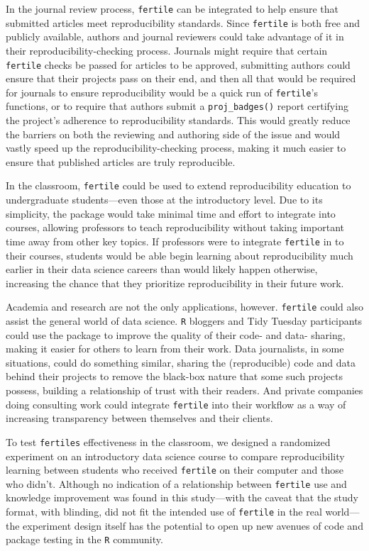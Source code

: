 \documentclass[12pt,twoside]{reedthesis}
\begin{document}
In the journal review process, \texttt{fertile} can be integrated to help ensure that submitted articles meet reproducibility standards. Since \texttt{fertile} is both free and publicly available, authors and journal reviewers could take advantage of it in their reproducibility-checking process. Journals might require that certain \texttt{fertile} checks be passed for articles to be approved, submitting authors could ensure that their projects pass on their end, and then all that would be required for journals to ensure reproducibility would be a quick run of \texttt{fertile}'s functions, or to require that authors submit a \texttt{proj\_badges()} report certifying the project's adherence to reproducibility standards. This would greatly reduce the barriers on both the reviewing and authoring side of the issue and would vastly speed up the reproducibility-checking process, making it much easier to ensure that published articles are truly reproducible.

In the classroom, \texttt{fertile} could be used to extend reproducibility education to undergraduate students---even those at the introductory level. Due to its simplicity, the package would take minimal time and effort to integrate into courses, allowing professors to teach reproducibility without taking important time away from other key topics. If professors were to integrate \texttt{fertile} in to their courses, students would be able begin learning about reproducibility much earlier in their data science careers than would likely happen otherwise, increasing the chance that they prioritize reproducibility in their future work.

Academia and research are not the only applications, however. \texttt{fertile} could also assist the general world of data science. \texttt{R} bloggers and Tidy Tuesday participants could use the package to improve the quality of their code- and data- sharing, making it easier for others to learn from their work. Data journalists, in some situations, could do something similar, sharing the (reproducible) code and data behind their projects to remove the black-box nature that some such projects possess, building a relationship of trust with their readers. And private companies doing consulting work could integrate \texttt{fertile} into their workflow as a way of increasing transparency between themselves and their clients.

To test \texttt{fertile\textquotesingle{}s} effectiveness in the classroom, we designed a randomized experiment on an introductory data science course to compare reproducibility learning between students who received \texttt{fertile} on their computer and those who didn't. Although no indication of a relationship between \texttt{fertile} use and knowledge improvement was found in this study---with the caveat that the study format, with blinding, did not fit the intended use of \texttt{fertile} in the real world---the experiment design itself has the potential to open up new avenues of code and package testing in the \texttt{R} community.
\end{document}
